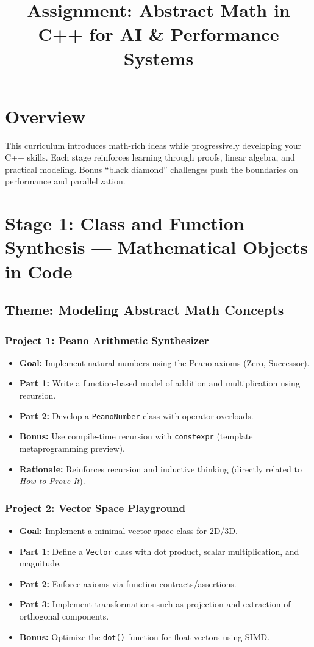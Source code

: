 \documentclass[12pt]{article}
\title{Assignment: Abstract Math in C++ for AI \& Performance Systems}
\author{}
\date{}
\begin{document}
\maketitle

\section*{Overview}
This curriculum introduces math-rich ideas while progressively developing your C++ skills. Each stage reinforces learning through proofs, linear algebra, and practical modeling. Bonus “black diamond” challenges push the boundaries on performance and parallelization.

\section{Stage 1: Class and Function Synthesis --- Mathematical Objects in Code}
\subsection*{Theme: Modeling Abstract Math Concepts}

\subsubsection*{Project 1: Peano Arithmetic Synthesizer}
\begin{itemize}[leftmargin=*]
    \item \textbf{Goal:} Implement natural numbers using the Peano axioms (Zero, Successor).
    \item \textbf{Part 1:} Write a function-based model of addition and multiplication using recursion.
    \item \textbf{Part 2:} Develop a \texttt{PeanoNumber} class with operator overloads.
    \item \textbf{Bonus:} Use compile-time recursion with \texttt{constexpr} (template metaprogramming preview).
    \item \textbf{Rationale:} Reinforces recursion and inductive thinking (directly related to \emph{How to Prove It}).
\end{itemize}

\subsubsection*{Project 2: Vector Space Playground}
\begin{itemize}[leftmargin=*]
    \item \textbf{Goal:} Implement a minimal vector space class for 2D/3D.
    \item \textbf{Part 1:} Define a \texttt{Vector} class with dot product, scalar multiplication, and magnitude.
    \item \textbf{Part 2:} Enforce axioms via function contracts/assertions.
    \item \textbf{Part 3:} Implement transformations such as projection and extraction of orthogonal components.
    \item \textbf{Bonus:} Optimize the \texttt{dot()} function for float vectors using SIMD.
\end{itemize}
\end{document}
